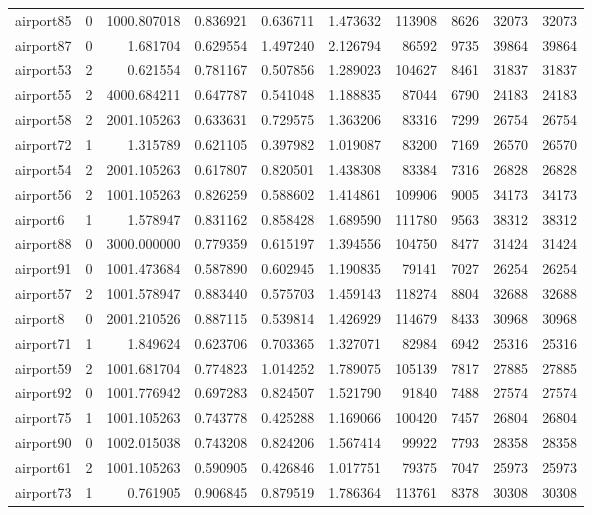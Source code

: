 \documentclass[../../../thesis.tex]{subfiles}
\begin{document}
\begin{longtable}{|l|r|r|r|r|r|r|r|r|r|}
airport85 & 0 & 1000.807018 & 0.836921 & 0.636711 & 1.473632 & 113908 & 8626 & 32073 & 32073 \\
airport87 & 0 & 1.681704 & 0.629554 & 1.497240 & 2.126794 & 86592 & 9735 & 39864 & 39864 \\
airport53 & 2 & 0.621554 & 0.781167 & 0.507856 & 1.289023 & 104627 & 8461 & 31837 & 31837 \\
airport55 & 2 & 4000.684211 & 0.647787 & 0.541048 & 1.188835 & 87044 & 6790 & 24183 & 24183 \\
airport58 & 2 & 2001.105263 & 0.633631 & 0.729575 & 1.363206 & 83316 & 7299 & 26754 & 26754 \\
airport72 & 1 & 1.315789 & 0.621105 & 0.397982 & 1.019087 & 83200 & 7169 & 26570 & 26570 \\
airport54 & 2 & 2001.105263 & 0.617807 & 0.820501 & 1.438308 & 83384 & 7316 & 26828 & 26828 \\
airport56 & 2 & 1001.105263 & 0.826259 & 0.588602 & 1.414861 & 109906 & 9005 & 34173 & 34173 \\
airport6 & 1 & 1.578947 & 0.831162 & 0.858428 & 1.689590 & 111780 & 9563 & 38312 & 38312 \\
airport88 & 0 & 3000.000000 & 0.779359 & 0.615197 & 1.394556 & 104750 & 8477 & 31424 & 31424 \\
airport91 & 0 & 1001.473684 & 0.587890 & 0.602945 & 1.190835 & 79141 & 7027 & 26254 & 26254 \\
airport57 & 2 & 1001.578947 & 0.883440 & 0.575703 & 1.459143 & 118274 & 8804 & 32688 & 32688 \\
airport8 & 0 & 2001.210526 & 0.887115 & 0.539814 & 1.426929 & 114679 & 8433 & 30968 & 30968 \\
airport71 & 1 & 1.849624 & 0.623706 & 0.703365 & 1.327071 & 82984 & 6942 & 25316 & 25316 \\
airport59 & 2 & 1001.681704 & 0.774823 & 1.014252 & 1.789075 & 105139 & 7817 & 27885 & 27885 \\
airport92 & 0 & 1001.776942 & 0.697283 & 0.824507 & 1.521790 & 91840 & 7488 & 27574 & 27574 \\
airport75 & 1 & 1001.105263 & 0.743778 & 0.425288 & 1.169066 & 100420 & 7457 & 26804 & 26804 \\
airport90 & 0 & 1002.015038 & 0.743208 & 0.824206 & 1.567414 & 99922 & 7793 & 28358 & 28358 \\
airport61 & 2 & 1001.105263 & 0.590905 & 0.426846 & 1.017751 & 79375 & 7047 & 25973 & 25973 \\
airport73 & 1 & 0.761905 & 0.906845 & 0.879519 & 1.786364 & 113761 & 8378 & 30308 & 30308 \\

\end{longtable}
\end{document}

